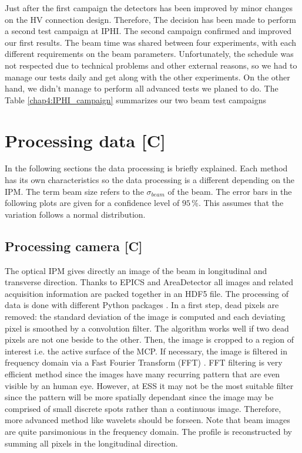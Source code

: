 \begin{refsection}
  

  Just after the first campaign the detectors has been improved by minor changes on the HV connection design. Therefore, The decision has been made to perform a second test campaign at IPHI.
  The second campaign confirmed and improved our first results.
  The beam time was shared between four experiments, with each different requirements on the beam parameters.
  Unfortunately, the schedule was not respected due to technical problems and other external reasons, so
  we had to manage our tests daily and get along with the other experiments.
  On the other hand, we didn't manage to perform all advanced tests we planed to do.
  The Table \ref{chap4:IPHI_campaign} summarizes our two beam test campaigns

  


  \section{Processing data [C]}
  In the following sections the data processing is briefly explained. Each method has its own characteristics so the data processing is a different depending on the IPM. The term beam size refers to the $\sigma_{beam}$ of the beam. The error bars in the following plots are given for a confidence level of $95\,\mathrm{\%}$. This assumes that the variation follows a normal distribution.

  \subsection{Processing camera [C]}
  The optical IPM gives directly an image of the beam in longitudinal and transverse direction. Thanks to EPICS and AreaDetector all images and related acquisition information are packed together in an HDF5 file. The processing of data is done with different Python packages \cite{NumPy2011,SciPy2019,Hunter2007}. In a first step, dead pixels are removed: the standard deviation of the image is computed and each deviating pixel is smoothed by a convolution filter. The algorithm works well if two dead pixels are not one beside to the other. Then, the image is cropped to a region of interest i.e. the active surface of the MCP.  If necessary, the image is filtered in frequency domain via a Fast Fourier Transform (FFT) \cite{Burrus2012}. FFT filtering is very efficient method since the images have many recurring pattern that are even visible by an human eye. However, at ESS it may not be the most suitable filter since the pattern will be more spatially dependant since the image may be comprised of small discrete spots rather than a continuous image. Therefore, more advanced method like wavelets \cite{Burrus1997,bultheel2014} should be forseen. Note that beam images are quite parsimonious in the frequency domain. The profile is reconstructed by summing all pixels in the longitudinal direction.


\end{refsection}
